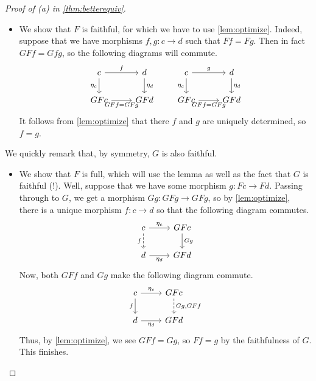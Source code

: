 \begin{proof}[Proof of (a) in \autoref{thm:betterequiv}]
\begin{itemize}
		\item We show that $F$ is faithful, for which we have to use \autoref{lem:optimize}. Indeed, suppose that we have morphisms $f,g:c\to d$ such that $Ff=Fg$. Then in fact $GFf=Gfg$, so the following diagrams will commute.
		\[\begin{tikzcd}
			c & d \\
			GFc & GFd
			\arrow["f", from=1-1, to=1-2]
			\arrow["{\eta_c}"', from=1-1, to=2-1]
			\arrow["{\eta_d}", from=1-2, to=2-2]
			\arrow["{GFf=GFg}"', from=2-1, to=2-2]
		\end{tikzcd}\qquad
		\begin{tikzcd}
			c & d \\
			GFc & GFd
			\arrow["g", from=1-1, to=1-2]
			\arrow["{\eta_c}"', from=1-1, to=2-1]
			\arrow["{\eta_d}", from=1-2, to=2-2]
			\arrow["{GFf=GFg}"', from=2-1, to=2-2]
		\end{tikzcd}\]
		It follows from \autoref{lem:optimize} that there $f$ and $g$ are uniquely determined, so $f=g$.
	\end{itemize}
	We quickly remark that, by symmetry, $G$ is also faithful.
	\begin{itemize}
		\item We show that $F$ is full, which will use the lemma as well as the fact that $G$ is faithful (!). Well, suppose that we have some morphism $g:Fc\to Fd$. Passing through to $G$, we get a morphism $Gg:GFg\to GFg$, so by \autoref{lem:optimize}, there is a unique morphism $f:c\to d$ so that the following diagram commutes.
		\[\begin{tikzcd}
			c & GFc \\
			d & GFd
			\arrow["f"', dashed, from=1-1, to=2-1]
			\arrow["Gg", from=1-2, to=2-2]
			\arrow["{\eta_c}", from=1-1, to=1-2]
			\arrow["{\eta_d}"', from=2-1, to=2-2]
		\end{tikzcd}\]
		Now, both $GFf$ and $Gg$ make the following diagram commute.
		\[\begin{tikzcd}
			c & GFc \\
			d & GFd
			\arrow["f"', from=1-1, to=2-1]
			\arrow["{Gg,GFf}", dashed, from=1-2, to=2-2]
			\arrow["{\eta_c}", from=1-1, to=1-2]
			\arrow["{\eta_d}"', from=2-1, to=2-2]
		\end{tikzcd}\]
		Thus, by \autoref{lem:optimize}, we see $GFf=Gg$, so $Ff=g$ by the faithfulness of $G$. This finishes.
		\qedhere
	\end{itemize}
\end{proof}
